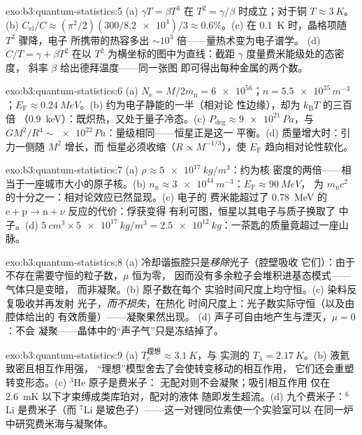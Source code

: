 \begin{solution}{exo:b3:quantum-statistics:5}
(a) $\gamma T = \beta T^3$ 在 $T^2 = \gamma/\beta$ 时成立；对于铜
$T \approx \qty{3}{K}$。(b) $C_{\text{el}}/C \approx
(\pi^2/2)(300/\num{8.2e4})/3 \approx 0.6\%$。(c) 在 \qty{0.1}{K}
时，晶格项随 $T^3$ 骤降，电子
所携带的热容多出 $\sim10^3$ 倍——量热术变为电子谱学。
(d) $C/T = \gamma + \beta T^2$ 在以
$T^2$ 为横坐标的图中为直线：截距 $\gamma$ 度量费米能级处的态密度，
斜率 $\beta$ 给出德拜温度——同一张图
即可得出每种金属的两个数。
\end{solution}

\begin{solution}{exo:b3:quantum-statistics:6}
(a) $N_{\text{e}} = M/2m_{\text{n}} = \num{6e56}$；$n =
\num{5.5e35}\,\unit{m^{-3}}$；$E_{\text{F}} \approx
\qty{0.24}{MeV}$。(b) 约为电子静能的一半（相对论
性边缘），却为 $k_{\text{B}}T$ 的三百倍
（\qty{0.9}{keV}）：既炽热，又处于量子冷态。(c)
$P_{\text{deg}} \approx \qty{9e21}{Pa}$，与 $GM^2/R^4 \sim
\num{e22}\,\unit{Pa}$：量级相同——恒星正是这一
平衡。(d) 质量增大时：引力一侧随 $M^2$ 增长，而
恒星必须收缩（$R \propto M^{-1/3}$），使 $E_{\text{F}}$
趋向相对论性软化。
\end{solution}

\begin{solution}{exo:b3:quantum-statistics:7}
(a) $\rho \approx \qty{5e17}{kg/m^3}$：约为核
密度的两倍——相当于一座城市大小的原子核。(b) $n_{\text{n}}
\approx \qty{3e44}{m^{-3}}$：$E_{\text{F}} \approx \qty{90}{MeV}$，
为 $m_{\text{n}}c^2$ 的十分之一：相对论效应已然显现。(c) 电子的
费米能超过了 \qty{0.78}{MeV} 的
$\text{e} + \text{p} \to \text{n} + \nu$ 反应的代价：俘获变得
有利可图，恒星以其电子与质子换取了
中子。(d) $\qty{5}{cm^3} \times \qty{5e17}{kg/m^3} =
\qty{2.5e12}{kg}$：一茶匙的质量竟超过一座山脉。
\end{solution}

\begin{solution}{exo:b3:quantum-statistics:8}
(a) 冷却谐振腔只是\emph{移除}光子（腔壁吸收
它们）：由于不存在需要守恒的粒子数，$\mu$ 恒为零，
因而没有多余粒子会堆积进基态模式——气体只是变暗，
而非凝聚。(b) 原子数在每个
实验时间尺度上均守恒。(c) 染料反复吸收并再发射
光子，\emph{而不损失}，在热化
时间尺度上：光子数实际守恒（以及由腔体给出的
有效质量）——凝聚果然出现。
(d) 声子可自由地产生与湮灭，$\mu = 0$：不会
凝聚——晶体中的“声子气”只是冻结掉了。
\end{solution}

\begin{solution}{exo:b3:quantum-statistics:9}
(a) $T_{\text{c}}^{\text{理想}} \approx \qty{3.1}{K}$，与
实测的 $T_\lambda = \qty{2.17}{K}$。(b) 液氦致密且相互作用强，
“理想”模型舍去了会使转变移动的相互作用，
它们还会重塑转变形态。(c) $^3$He 原子是费米子：
无配对则不会凝聚；吸引相互作用
仅在 \qty{2.6}{mK} 以下才束缚成类库珀对，配对的液体
随即发生超流。(d) 九个费米子：$^6$Li 是费米子（而
$^7$Li 是玻色子）——这一对锂同位素使一个实验室可以
在同一炉中研究费米海与凝聚体。
\end{solution}

